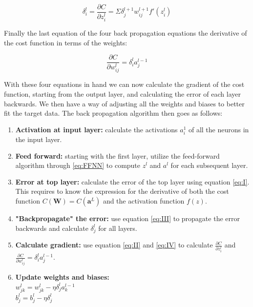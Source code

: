 \documentclass[a4paper, UKenglish, 11pt]{uiomaster}
\begin{document}
\begin{equation}
    \delta_i^l = \frac{\partial C}{\partial z^l_{i}} = \Sigma \delta_j^{l+1}w_{ij}^{l+1}f'(z_i^l)
\label{eq:III}
\end{equation}

Finally the last equation of the four back propagation equations the derivative of the cost function in terms of the weights:

\begin{equation}
    \frac{\partial C}{\partial w^l_{ij}} = \delta_i^l a_j^{l-1}
\label{eq:IV}
\end{equation}

With these four equations in hand we can now calculate the gradient of the cost function, starting from the output layer, and calculating the error of each layer backwards. We then have a way of adjusting all the weights and biases to better fit the target data. The back propagation algorithm then goes as follows:

\begin{enumerate}
  \item \textbf{Activation at input layer:} calculate the activations $a_i^1$ of all the neurons in the input layer.
  \item \textbf{Feed forward:} starting with the first layer, utilize the feed-forward algorithm through \ref{eq:FFNN} to compute $z^{l}$ and $a^{l}$ for each subsequent layer.
  \item \textbf{Error at top layer:} calculate the error of the top layer using equation \ref{eq:I}. This requires to know the expression for the derivative of both the cost function $C(\boldsymbol{W}) = C(\boldsymbol{a}^L)$ and the activation function $f(z)$.
  \item \textbf{"Backpropagate" the error:} use equation \ref{eq:III} to propagate the error backwards and calculate $\delta_j^l$ for all layers.
  \item \textbf{Calculate gradient:} use equation \ref{eq:II} and \ref{eq:IV} to calculate $\frac{\partial C}{\partial z^l_{i}}$ and $\frac{\partial C}{\partial w^l_{ij}} = \delta_i^l a_j^{l-1}$. \newline
  \item \textbf{Update weights and biases:} \\[2pt] $w^l_{jk}=w^l_{jk}-\eta\delta^l_ja^{l-1}_k$ \\[2pt] $b_j^l = b_j^l - \eta \delta_j^l$
\end{enumerate}
\end{document}
